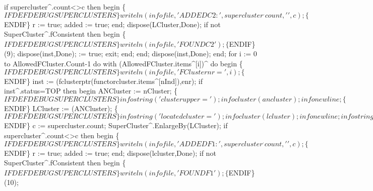                   if supercluster^.count<>c then
                  begin
                     \{$IFDEF DEBUGSUPERCLUSTERS\}
                     writeln(infofile,'ADDEDC2:',supercluster^.count,' ',c);
                     \{$ENDIF\}
                     r := true;
                     added := true;
                  end;
                  dispose(LCluster,Done);
                  if not SuperCluster^.fConsistent then
                  begin
                     \{$IFDEF DEBUGSUPERCLUSTERS\}
                     writeln(infofile,'FOUNDC2');
                     \{$ENDIF\}
                     (9);
                     dispose(inst,Done);
                      := true;
                     exit;
                  end;
               end;
            dispose(inst,Done);
         end;
         for i := 0 to AllowedFCluster.Count-1 do
            with (AllowedFCluster.items^[i])^ do
         begin
            \{$IFDEF DEBUGSUPERCLUSTERS\}
            writeln(infofile,'FClusternr=',i);
            \{$ENDIF\}
            inst := (fclusterptr(functorcluster.items^[nInd]),enr);
            if inst^.status=TOP then
            begin
               ANCluster := nCluster;
               \{$IFDEF DEBUGSUPERCLUSTERS\}
               infostring('clusterupper=');
               infocluster(ancluster);
               infonewline;
               \{$ENDIF\}
               LCluster := (ANCluster);
               \{$IFDEF DEBUGSUPERCLUSTERS\}
               infostring('locatedcluster=');
               infocluster(lcluster);
               infonewline;
               infostring('supercluster=');
               infocluster(supercluster);
               infonewline;
               \{$ENDIF\}
               c := supercluster.count;
               SuperCluster^.EnlargeBy(LCluster);
               if supercluster^.count<>c then
               begin
                  \{$IFDEF DEBUGSUPERCLUSTERS\}
                  writeln(infofile,'ADDEDF1:',supercluster^.count,' ',c);
                  \{$ENDIF\}
                  r := true;
                  added := true;
               end;
               dispose(lcluster,Done);
               if not SuperCluster^.fConsistent then
               begin
                  \{$IFDEF DEBUGSUPERCLUSTERS\}
                  writeln(infofile,'FOUNDF1');
                  \{$ENDIF\}
                  (10);
